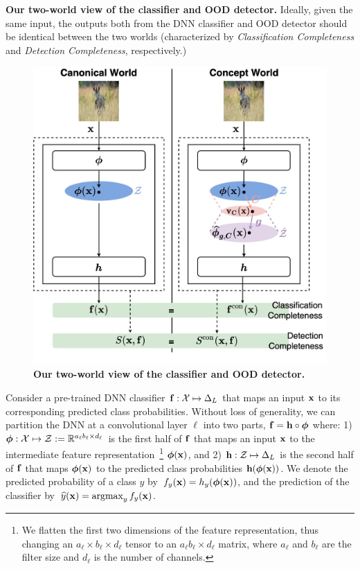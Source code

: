 \caption{\small \textbf{Our two-world view of the classifier and OOD detector.} Ideally, given the same input, the outputs both from the DNN classifier and OOD detector should be identical between the two worlds (characterized by \textit{Classification Completeness} and \textit{Detection Completeness}, respectively.)}

\begin{figure}[t]
\centering
\includegraphics[scale=0.17]{figures/completeness_3.jpeg} 
\caption{\textbf{Our two-world view of the classifier and OOD detector.}}
\label{fig:detection-completeness}
\end{figure}

\fi

Consider a pre-trained DNN classifier $\mathbf{f} : \mathcal{X} \mapsto \Delta_L$ that maps an input $\mathbf{x}$ to its corresponding predicted class probabilities. 
Without loss of generality, we can partition the DNN at a convolutional layer $\ell$ into two parts, \ie $\mathbf{f} = \mathbf{h} \circ \bm{\phi}$ where: 1) $\bm{\phi} : \mathcal{X} \mapsto \mathcal{Z} := \mathbb{R}^{a_\ell b_\ell \times d_\ell}\,$ is the first half of $\mathbf{f}$ that maps an input $\mathbf{x}$ to the intermediate feature representation~\footnote{We flatten the first two dimensions of the feature representation, thus changing an $a_\ell \times b_\ell \times d_\ell$ tensor to an $a_\ell b_\ell \times d_\ell$ matrix, where $a_\ell$ and $b_\ell$ are the filter size and $d_\ell$ is the number of channels.} $\bm{\phi}(\mathbf{x})$, and 2) $\mathbf{h} : \mathcal{Z} \mapsto \Delta_L$ is the second half of $\mathbf{f}$ that maps $\bm{\phi}(\mathbf{x})$ to the predicted class probabilities $\mathbf{h}(\bm{\phi}(\mathbf{x}))$.
We denote the predicted probability of a class $y$ by $\,f_y(\mathbf{x}) = h_y(\bm{\phi}(\mathbf{x}))$, and the prediction of the classifier by $\,\widehat{y}(\bfx) = \argmax_{y} f_y(\bfx)$.

